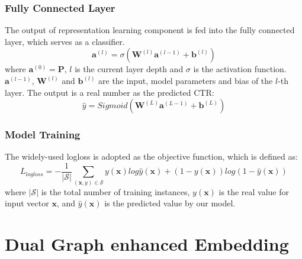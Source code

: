 \subsubsection{Fully Connected Layer}
The output of representation learning component is fed into the fully connected layer, which serves as a classifier.
\begin{equation}
 \textbf{a}^{(l)} = \sigma(\textbf{W}^{(l)}\textbf{a}^{(l-1)}+\textbf{b}^{(l)})
 \end{equation}
 where $\textbf{a}^{(0)} = \textbf{P}$, $l$ is the current layer depth and $\sigma$ is the activation function. $\textbf{a}^{(l-1)}$, $\textbf{W}^{(l)}$ and $\textbf{b}^{(l)}$ are the input, model parameters and bias of the $l$-th layer. The output is a real number as the predicted CTR:
\begin{equation}
\widehat{y} = Sigmoid(\textbf{W}^{(L)}\textbf{a}^{(L-1)}+\textbf{b}^{(L)})
 \end{equation}
 
\subsubsection{Model Training}
The widely-used logloss is adopted as the objective function, which is defined as:
\begin{equation}
L_{logloss} = -\frac{1}{|\mathcal{S}|}\sum_{(\textbf{x}, y) \in \mathcal{S} }{y(\textbf{x})log\widehat{y}(\textbf{x})+(1-y(\textbf{x}))log(1-\widehat{y}(\textbf{x}))}
 \end{equation}
where $|\mathcal{S}|$  is the total number of training instances, $y(\textbf{x})$ is the real value for input vector $\textbf{x}$, and $\widehat{y}(\textbf{x})$ is the predicted value by our model.


\section{Dual Graph enhanced Embedding}

